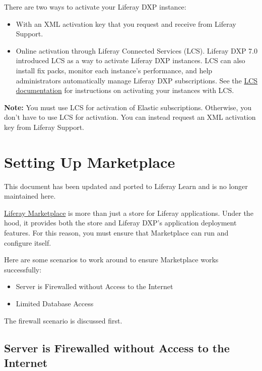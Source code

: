 There are two ways to activate your Liferay DXP instance:

\begin{itemize}
\item
  With an XML activation key that you request and receive from Liferay
  Support.
\item
  Online activation through Liferay Connected Services (LCS). Liferay
  DXP 7.0 introduced LCS as a way to activate Liferay DXP instances. LCS
  can also install fix packs, monitor each instance's performance, and
  help administrators automatically manage Liferay DXP subscriptions.
  See the
  \href{/docs/7-1/deploy/-/knowledge_base/d/managing-liferay-dxp-with-liferay-connected-services}{LCS
  documentation} for instructions on activating your instances with LCS.
\end{itemize}

\noindent\hrulefill

\textbf{Note:} You must use LCS for activation of Elastic subscriptions.
Otherwise, you don't have to use LCS for activation. You can instead
request an XML activation key from Liferay Support.

\noindent\hrulefill

\chapter{Setting Up Marketplace}\label{setting-up-marketplace}

{This document has been updated and ported to Liferay Learn and is no
longer maintained here.}

\href{https://www.liferay.com/marketplace}{Liferay Marketplace} is more
than just a store for Liferay applications. Under the hood, it provides
both the store and Liferay DXP's application deployment features. For
this reason, you must ensure that Marketplace can run and configure
itself.

Here are some scenarios to work around to ensure Marketplace works
successfully:

\begin{itemize}
\tightlist
\item
  Server is Firewalled without Access to the Internet
\item
  Limited Database Access
\end{itemize}

The firewall scenario is discussed first.

\section{Server is Firewalled without Access to the
Internet}\label{server-is-firewalled-without-access-to-the-internet}

